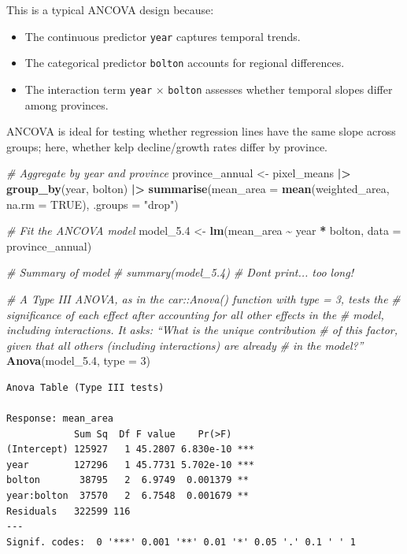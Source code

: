 \documentclass[
  british,
  10pt,
]{article}
\newenvironment{Shaded}{\begin{snugshade}}{\end{snugshade}}
\newcommand{\AttributeTok}[1]{\textcolor[rgb]{0.13,0.29,0.53}{#1}}
\newcommand{\CommentTok}[1]{\textcolor[rgb]{0.56,0.35,0.01}{\textit{#1}}}
\newcommand{\ConstantTok}[1]{\textcolor[rgb]{0.56,0.35,0.01}{#1}}
\newcommand{\DecValTok}[1]{\textcolor[rgb]{0.00,0.00,0.81}{#1}}
\newcommand{\FloatTok}[1]{\textcolor[rgb]{0.00,0.00,0.81}{#1}}
\newcommand{\FunctionTok}[1]{\textcolor[rgb]{0.13,0.29,0.53}{\textbf{#1}}}
\newcommand{\NormalTok}[1]{#1}
\newcommand{\OtherTok}[1]{\textcolor[rgb]{0.56,0.35,0.01}{#1}}
\newcommand{\SpecialCharTok}[1]{\textcolor[rgb]{0.81,0.36,0.00}{\textbf{#1}}}
\newcommand{\StringTok}[1]{\textcolor[rgb]{0.31,0.60,0.02}{#1}}
\providecommand{\tightlist}{%
  \setlength{\itemsep}{0pt}\setlength{\parskip}{0pt}}
\let\oldtexttt\texttt
\renewcommand{\texttt}[1]{\oldtexttt{\small #1}}
\begin{document}
This is a typical ANCOVA design because:

\begin{itemize}
\tightlist
\item
  The continuous predictor \texttt{year} captures temporal trends.
\item
  The categorical predictor \texttt{bolton} accounts for regional
  differences.
\item
  The interaction term \texttt{year} × \texttt{bolton} assesses whether
  temporal slopes differ among provinces.
\end{itemize}

ANCOVA is ideal for testing whether regression lines have the same slope
across groups; here, whether kelp decline/growth rates differ by
province.

\begin{Shaded}
\begin{Highlighting}[]
\CommentTok{\# Aggregate by year and province}
\NormalTok{province\_annual }\OtherTok{\textless{}{-}}\NormalTok{ pixel\_means }\SpecialCharTok{|\textgreater{}}
  \FunctionTok{group\_by}\NormalTok{(year, bolton) }\SpecialCharTok{|\textgreater{}}
  \FunctionTok{summarise}\NormalTok{(}\AttributeTok{mean\_area =} \FunctionTok{mean}\NormalTok{(weighted\_area, }\AttributeTok{na.rm =} \ConstantTok{TRUE}\NormalTok{), }\AttributeTok{.groups =} \StringTok{"drop"}\NormalTok{)}

\CommentTok{\# Fit the ANCOVA model}
\NormalTok{model\_5}\FloatTok{.4} \OtherTok{\textless{}{-}} \FunctionTok{lm}\NormalTok{(mean\_area }\SpecialCharTok{\textasciitilde{}}\NormalTok{ year }\SpecialCharTok{*}\NormalTok{ bolton, }\AttributeTok{data =}\NormalTok{ province\_annual)}

\CommentTok{\# Summary of model}
\CommentTok{\# summary(model\_5.4)  \# Dont print... too long!}

\CommentTok{\# A Type III ANOVA, as in the car::Anova() function with type = 3, tests the}
\CommentTok{\# significance of each effect after accounting for all other effects in the}
\CommentTok{\# model, including interactions. It asks: “What is the unique contribution}
\CommentTok{\# of this factor, given that all others (including interactions) are already}
\CommentTok{\# in the model?”}
\FunctionTok{Anova}\NormalTok{(model\_5}\FloatTok{.4}\NormalTok{, }\AttributeTok{type =} \DecValTok{3}\NormalTok{)}
\end{Highlighting}
\end{Shaded}

\begin{verbatim}
Anova Table (Type III tests)

Response: mean_area
            Sum Sq  Df F value    Pr(>F)    
(Intercept) 125927   1 45.2807 6.830e-10 ***
year        127296   1 45.7731 5.702e-10 ***
bolton       38795   2  6.9749  0.001379 ** 
year:bolton  37570   2  6.7548  0.001679 ** 
Residuals   322599 116                      
---
Signif. codes:  0 '***' 0.001 '**' 0.01 '*' 0.05 '.' 0.1 ' ' 1
\end{verbatim}
\end{document}

